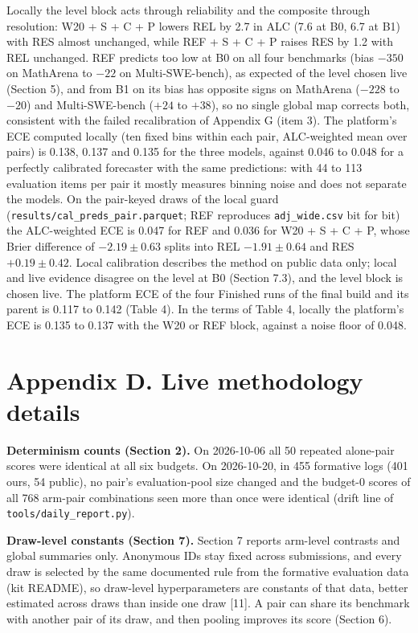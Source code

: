 \documentclass[
]{article}
\begin{document}
Locally the level block acts through reliability and the composite
through resolution: W20 + S + C + P lowers REL by 2.7 in ALC (7.6 at B0,
6.7 at B1) with RES almost unchanged, while REF + S + C + P raises RES
by 1.2 with REL unchanged. REF predicts too low at B0 on all four
benchmarks (bias \(-350\) on MathArena to \(-22\) on Multi-SWE-bench),
as expected of the level chosen live (Section 5), and from B1 on its
bias has opposite signs on MathArena (\(-228\) to \(-20\)) and
Multi-SWE-bench (\(+24\) to \(+38\)), so no single global map corrects
both, consistent with the failed recalibration of Appendix G (item 3).
The platform's ECE computed locally (ten fixed bins within each pair,
ALC-weighted mean over pairs) is 0.138, 0.137 and 0.135 for the three
models, against 0.046 to 0.048 for a perfectly calibrated forecaster
with the same predictions: with 44 to 113 evaluation items per pair it
mostly measures binning noise and does not separate the models. On the
pair-keyed draws of the local guard
(\texttt{results/cal\_preds\_pair.parquet}; REF reproduces
\texttt{adj\_wide.csv} bit for bit) the ALC-weighted ECE is 0.047 for
REF and 0.036 for W20 + S + C + P, whose Brier difference of
\(-2.19 \pm 0.63\) splits into REL \(-1.91 \pm 0.64\) and RES
\(+0.19 \pm 0.42\). Local calibration describes the method on public
data only; local and live evidence disagree on the level at B0 (Section
7.3), and the level block is chosen live. The platform ECE of the four
Finished runs of the final build and its parent is 0.117 to 0.142 (Table
4). In the terms of Table 4, locally the platform's ECE is 0.135 to
0.137 with the W20 or REF block, against a noise floor of 0.048.

\section{Appendix D. Live methodology
details}\label{appendix-d.-live-methodology-details}

\textbf{Determinism counts (Section 2).} On 2026-10-06 all 50 repeated
alone-pair scores were identical at all six budgets. On 2026-10-20, in
455 formative logs (401 ours, 54 public), no pair's evaluation-pool size
changed and the budget-0 scores of all 768 arm-pair combinations seen
more than once were identical (drift line of
\texttt{tools/daily\_report.py}).

\textbf{Draw-level constants (Section 7).} Section 7 reports arm-level
contrasts and global summaries only. Anonymous IDs stay fixed across
submissions, and every draw is selected by the same documented rule from
the formative evaluation data (kit README), so draw-level
hyperparameters are constants of that data, better estimated across
draws than inside one draw {[}11{]}. A pair can share its benchmark with
another pair of its draw, and then pooling improves its score (Section
6).
\end{document}
